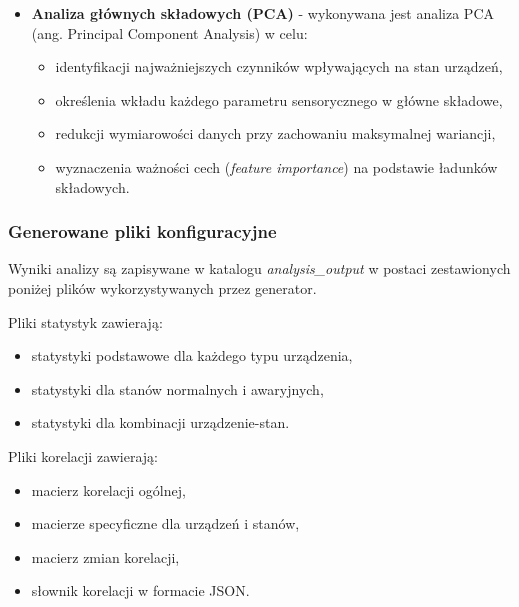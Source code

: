\begin{itemize}
    \item \textbf{Analiza głównych składowych (PCA)} - wykonywana jest analiza PCA (ang. Principal Component Analysis) \cite{jolliffe_pca} w celu:
    
\begin{itemize}
    \item identyfikacji najważniejszych czynników wpływających na stan urządzeń,
    \item określenia wkładu każdego parametru sensorycznego w główne składowe,
    \item redukcji wymiarowości danych przy zachowaniu maksymalnej wariancji,
    \item wyznaczenia ważności cech (\textit{feature importance}) na podstawie ładunków składowych.
\end{itemize}

\end{itemize}

\newpage

\subsubsection{Generowane pliki konfiguracyjne}

Wyniki analizy są zapisywane w katalogu \textit{analysis\_output} w postaci zestawionych poniżej plików wykorzystywanych przez generator.

\vspace{0.3em}

Pliki statystyk zawierają:
\begin{itemize}
    \item statystyki podstawowe dla każdego typu urządzenia,
    \item statystyki dla stanów normalnych i awaryjnych,
    \item statystyki dla kombinacji urządzenie-stan.
\end{itemize}

\vspace{0.3em}

Pliki korelacji zawierają:
\begin{itemize}
    \item macierz korelacji ogólnej,
    \item macierze specyficzne dla urządzeń i stanów,
    \item macierz zmian korelacji,
    \item słownik korelacji w formacie JSON.
\end{itemize}

